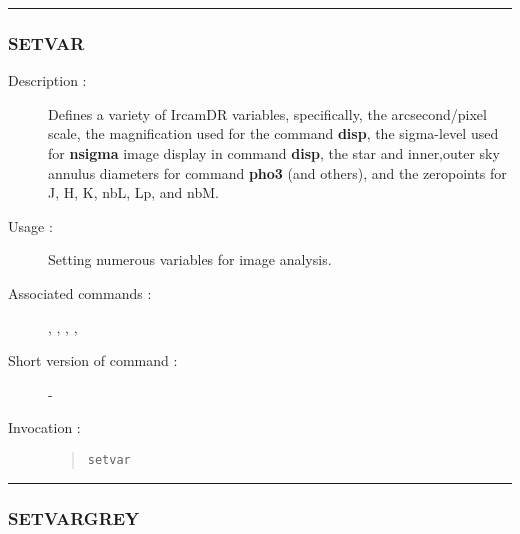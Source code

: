 \hrule 
\subsubsection*{\label{SETVAR}SETVAR}

\begin{description}

\item[Description :] Defines a variety of {\sc IrcamDR} variables,
specifically, the arcsecond/pixel scale, the magnification used for the
command {\bf disp}, the sigma-level used for {\bf nsigma} image display
in command {\bf disp}, the star and inner,outer sky annulus diameters
for command {\bf pho3} (and others), and the zeropoints for J, H, K,
nbL, Lp, and nbM.

\item[Usage :] Setting numerous variables for image analysis.

\item[Associated commands :] {\tt {}}, 
{\tt {}}, {\tt {}}, 
{\tt {}}, {\tt {}}

\item[Short version of command :] -
\item[Invocation :]

\begin{quote}{\tt  setvar }\end{quote}

\end{description}

\hrule 
\subsubsection*{\label{SETVARGREY}SETVARGREY}

